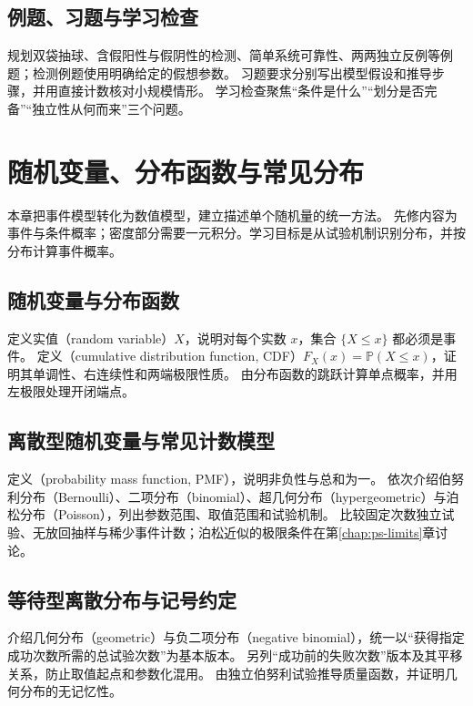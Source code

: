 \documentclass[UTF8,12pt,a4paper,fontset=fandol]{ctexbook}
\begin{document}
\section{例题、习题与学习检查}
规划双袋抽球、含假阳性与假阴性的检测、简单系统可靠性、两两独立反例等例题；检测例题使用明确给定的假想参数。
习题要求分别写出模型假设和推导步骤，并用直接计数核对小规模情形。
学习检查聚焦“条件是什么”“划分是否完备”“独立性从何而来”三个问题。


\chapter{随机变量、分布函数与常见分布}
\label{chap:ps-univariate}

本章把事件模型转化为数值模型，建立描述单个随机量的统一方法。
先修内容为事件与条件概率；密度部分需要一元积分。学习目标是从试验机制识别分布，并按分布计算事件概率。

\section{随机变量与分布函数}
\label{sec:ps-random-variable-cdf}
定义实值（random variable）$X$，说明对每个实数 $x$，集合 $\{X\leq x\}$ 都必须是事件。
定义（cumulative distribution function, CDF）$F_X(x)=\mathbb P(X\leq x)$，证明其单调性、右连续性和两端极限性质。
由分布函数的跳跃计算单点概率，并用左极限处理开闭端点。

\section{离散型随机变量与常见计数模型}
\label{sec:ps-discrete-distributions}
定义（probability mass function, PMF），说明非负性与总和为一。
依次介绍伯努利分布（Bernoulli）、二项分布（binomial）、超几何分布（hypergeometric）与泊松分布（Poisson），列出参数范围、取值范围和试验机制。
比较固定次数独立试验、无放回抽样与稀少事件计数；泊松近似的极限条件在第\ref{chap:ps-limits}章讨论。

\section{等待型离散分布与记号约定}
\label{sec:ps-discrete-waiting}
介绍几何分布（geometric）与负二项分布（negative binomial），统一以“获得指定成功次数所需的总试验次数”为基本版本。
另列“成功前的失败次数”版本及其平移关系，防止取值起点和参数化混用。
由独立伯努利试验推导质量函数，并证明几何分布的无记忆性。
\end{document}
